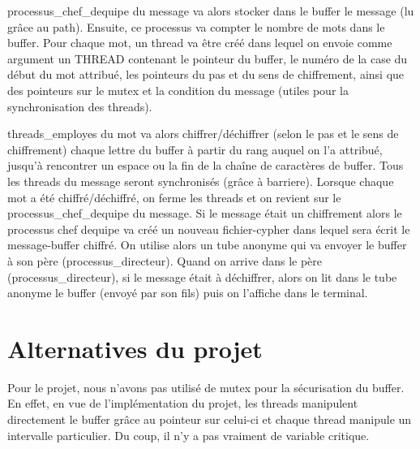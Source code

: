 \documentclass[a4]{article}
\begin{document}
processus\_chef\_dequipe du message va alors stocker dans le buffer le message (lu grâce au path).
Ensuite, ce processus va compter le nombre de mots dans le buffer. Pour chaque mot, un thread va être créé 
dans lequel on envoie comme argument un THREAD contenant le pointeur du buffer, le numéro de la case du 
début du mot attribué, les pointeurs du pas et du sens de chiffrement, ainsi que des pointeurs sur le mutex 
et la condition du message (utiles pour la synchronisation des threads).\newline \newline

threads\_employes du mot va alors chiffrer/déchiffrer (selon le pas et le sens de 
chiffrement) chaque lettre du buffer à partir du rang auquel on l'a attribué, jusqu'à rencontrer un espace 
ou la fin de la chaîne de caractères de buffer. 
Tous les threads du message seront synchronisés (grâce à barriere). 
Lorsque chaque mot a été chiffré/déchiffré, on ferme les threads et on revient sur le processus\_chef\_dequipe du message. 
Si le message était un chiffrement alors le processus chef dequipe va créé un nouveau fichier-cypher dans lequel sera écrit 
le message-buffer chiffré. On utilise alors un tube anonyme qui va envoyer le buffer à son père (processus\_directeur). \newline
Quand on arrive dans le père (processus\_directeur), si le message était à déchiffrer, alors on lit dans le tube anonyme le buffer 
(envoyé par son fils) puis on l'affiche dans le terminal.

\section{Alternatives du projet}

Pour le projet, nous n'avons pas utilisé de mutex pour la sécurisation du buffer. En effet, en vue de l'implémentation du projet, 
les threads manipulent directement le buffer grâce au pointeur sur celui-ci et chaque thread manipule un intervalle particulier. Du coup, 
il n'y a pas vraiment de variable critique. 
\end{document}
